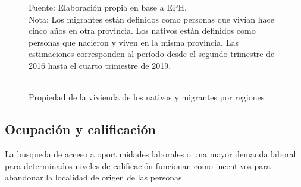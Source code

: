 \documentclass[12pt,a4paper]{article}
\begin{document}
\begin{figure}[htbp!]
\begin{center}
\caption{\\Propiedad de la vivienda de los nativos y migrantes por regiones}
\label{figure:vivienda_mig}
 
\end{center}
\begin{flushleft}
\begin{scriptsize}
Fuente: Elaboración propia en base a EPH.\\
Nota: Los migrantes están definidos como personas que vivían hace cinco años en otra provincia. Los nativos están definidos como personas que nacieron y viven en la misma provincia. Las estimaciones corresponden al período desde el segundo trimestre de 2016 hasta el cuarto trimestre de 2019.\end{scriptsize}
\end{flushleft}
\end{figure}
 


% 
\subsection{Ocupación y calificación}
La busqueda de acceso a oportunidades laborales o una mayor demanda laboral para determinados niveles de calificación funcionan como incentivos para abandonar la localidad de origen de las personas.
\end{document}
